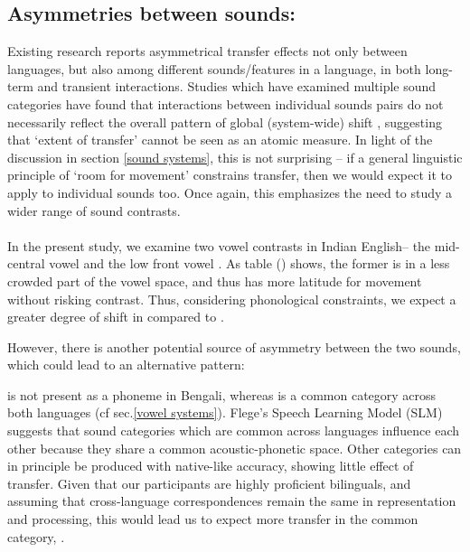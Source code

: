 \documentclass[11pt]{article}
\newcommand{\nt}[1]{\textipa{[#1]}} %
\begin{document}
\subsection{Asymmetries between sounds:}\label{asymmetry between sounds}

Existing research reports asymmetrical transfer effects not only between languages, but also among different sounds/features in a language, in both long-term and transient interactions. Studies which have examined multiple sound categories have found that interactions between individual sounds pairs do not necessarily reflect the overall pattern of global (system-wide) shift \cite{chang2012rapid,elias2017effects}, suggesting that `extent of transfer' cannot be seen as an atomic measure. In light of the discussion in section \ref{sound systems}, this is not surprising -- if a general linguistic principle of `room for movement' constrains transfer, then we would expect it to apply to individual sounds too. Once again, this emphasizes the need to study a wider range of sound contrasts.

\paragraph{}In the present study, we examine two vowel contrasts in Indian English-- the mid-central vowel \nt{2} and the low front vowel \nt{\ae}. As table () shows, the former is in a less crowded part of the vowel space, and thus has more latitude for movement without risking contrast. Thus, considering phonological constraints, we expect a greater degree of shift in \nt{2} compared to \nt{\ae}.

However, there is another potential source of asymmetry between the two sounds, which could lead to an alternative pattern:

\nt{2} is not present as a phoneme in Bengali, whereas \nt{\ae} is a common category across both languages (cf sec.\ref{vowel systems}). Flege's Speech Learning Model (SLM) \cite{flege1995second,flege2007language} suggests that sound categories which are common across languages influence each other because they share a common acoustic-phonetic space. Other categories can in principle be produced with native-like accuracy, showing little effect of transfer. Given that our participants are highly proficient bilinguals, and assuming that cross-language correspondences remain the same in representation and processing, this would lead us to expect more transfer in the common category, \nt{\ae}. 
\end{document}
